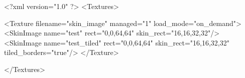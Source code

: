 <?xml version="1.0" ?>
<Textures>

	<Texture filename="skin_image" managed="1" load_mode="on_demand">
		<SkinImage name="test" rect="0,0,64,64" skin_rect="16,16,32,32"/>
		<SkinImage name="test_tiled" rect="0,0,64,64" skin_rect="16,16,32,32" tiled_borders="true"/>
	</Texture>
	
</Textures>
